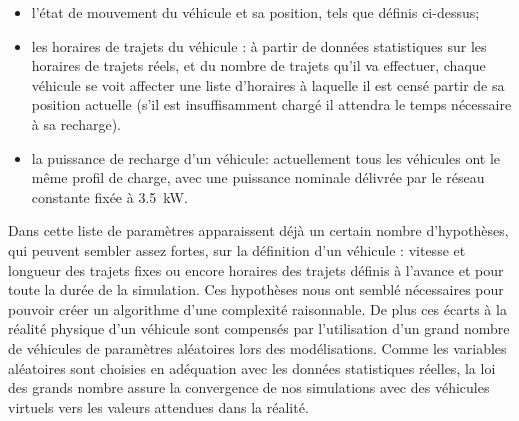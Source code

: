 \begin{itemize}
			\item l'état de mouvement du véhicule et sa position, tels que définis ci-dessus;
			\item les horaires de trajets du véhicule : à partir de données statistiques sur les horaires de trajets réels, et du nombre de trajets qu'il va effectuer, chaque véhicule se voit affecter une liste d'horaires à laquelle il est censé partir de sa position actuelle (s'il est insuffisamment chargé il attendra le temps nécessaire à sa recharge).
			\item la puissance de recharge d'un véhicule: actuellement tous les véhicules ont le même profil de charge, avec une puissance nominale délivrée par le réseau constante fixée à \SI{3,5}{\kilo\watt}.
		\end{itemize}
		
		Dans cette liste de paramètres apparaissent déjà un certain nombre d'hypothèses, qui peuvent sembler assez fortes, sur la définition d'un véhicule : vitesse et longueur des trajets fixes ou encore horaires des trajets définis à l'avance et pour toute la durée de la simulation.
		Ces hypothèses nous ont semblé nécessaires pour pouvoir créer un algorithme d'une complexité raisonnable. De plus ces écarts à la réalité physique d'un véhicule sont compensés par l'utilisation d'un grand nombre de véhicules de paramètres aléatoires lors des modélisations. Comme les variables aléatoires sont choisies en adéquation avec les données statistiques réelles, la loi des grands nombre assure la convergence de nos simulations avec des véhicules virtuels vers les valeurs attendues dans la réalité.
		
